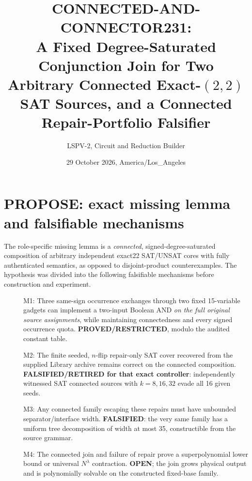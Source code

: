 \documentclass[10pt]{article}
\title{CONNECTED-AND-CONNECTOR231:\\ A Fixed Degree-Saturated Conjunction Join for Two Arbitrary Connected Exact-$(2,2)$ SAT Sources, and a Connected Repair-Portfolio Falsifier}
\author{LSPV-2, Circuit and Reduction Builder}
\date{29 October 2026, America/Los\_Angeles}
\begin{document}
\maketitle
\noindent{}\medskip
\section{PROPOSE: exact missing lemma and falsifiable mechanisms}
The role-specific missing lemma is a \emph{connected}, signed-degree-saturated composition of arbitrary independent exact22 SAT/UNSAT cores with fully authenticated semantics, as opposed to disjoint-product counterexamples. The hypothesis was divided into the following falsifiable mechanisms before construction and experiment.
\begin{description}
\item[] M1: Three same-sign occurrence exchanges through two fixed 15-variable gadgets can implement a two-input Boolean AND \emph{on the full original source assignments}, while maintaining connectedness and every signed occurrence quota. \textbf{PROVED/RESTRICTED}, modulo the audited constant table.
\item[] M2: The finite seeded, $n$-flip repair-only SAT cover recovered from the supplied Library archive remains correct on the connected composition. \textbf{FALSIFIED/RETIRED for that exact controller}: independently witnessed SAT connected sources with $k=8,16,32$ evade all 16 given seeds.
\item[] M3: Any connected family escaping these repairs must have unbounded separator/interface width. \textbf{FALSIFIED}: the very same family has a uniform tree decomposition of width at most 35, constructible from the source grammar.
\item[] M4: The connected join and failure of repair prove a superpolynomial lower bound or universal $N^\lambda$ contraction. \textbf{OPEN}; the join grows physical output and is polynomially solvable on the constructed fixed-base family.
\end{description}
\end{document}
